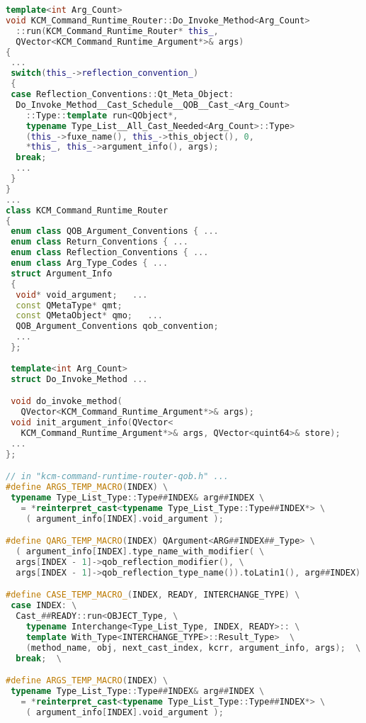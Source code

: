 \vspace{-.5em}
\begin{lstlisting}[caption={%
\emblink{\#lst--rzsem--\thelstlisting.pgvm-pdf}{Sample Code Graph Evaluator}},
  language = C++, numbers = none, label={lst:rzsem},
    basicstyle = \ttfamily\bfseries\footnotesize, linewidth = \linewidth]
template<int Arg_Count> 
void KCM_Command_Runtime_Router::Do_Invoke_Method<Arg_Count>
  ::run(KCM_Command_Runtime_Router* this_, 
  QVector<KCM_Command_Runtime_Argument*>& args)
{
 ...
 switch(this_->reflection_convention_)
 {
 case Reflection_Conventions::Qt_Meta_Object:
  Do_Invoke_Method__Cast_Schedule__QOB__Cast_<Arg_Count>
    ::Type::template run<QObject*, 
    typename Type_List__All_Cast_Needed<Arg_Count>::Type>
    (this_->fuxe_name(), this_->this_object(), 0, 
    *this_, this_->argument_info(), args);
  break;
  ...
 }
}
...
class KCM_Command_Runtime_Router
{
 enum class QOB_Argument_Conventions { ...
 enum class Return_Conventions { ...
 enum class Reflection_Conventions { ...
 enum class Arg_Type_Codes { ...
 struct Argument_Info 
 {
  void* void_argument;   ...
  const QMetaType* qmt;
  const QMetaObject* qmo;   ...
  QOB_Argument_Conventions qob_convention; 
  ...
 };
 
 template<int Arg_Count>
 struct Do_Invoke_Method ...

 void do_invoke_method(
   QVector<KCM_Command_Runtime_Argument*>& args);
 void init_argument_info(QVector<
   KCM_Command_Runtime_Argument*>& args, QVector<quint64>& store);
 ...
};

// in "kcm-command-runtime-router-qob.h" ...
#define ARGS_TEMP_MACRO(INDEX) \
 typename Type_List_Type::Type##INDEX& arg##INDEX \
   = *reinterpret_cast<typename Type_List_Type::Type##INDEX*> \
    ( argument_info[INDEX].void_argument );

#define QARG_TEMP_MACRO(INDEX) QArgument<ARG##INDEX##_Type> \
  ( argument_info[INDEX].type_name_with_modifier( \
  args[INDEX - 1]->qob_reflection_modifier(), \
  args[INDEX - 1]->qob_reflection_type_name()).toLatin1(), arg##INDEX) \

#define CASE_TEMP_MACRO_(INDEX, READY, INTERCHANGE_TYPE) \
 case INDEX: \
  Cast_##READY::run<OBJECT_Type, \
    typename Interchange<Type_List_Type, INDEX, READY>:: \
    template With_Type<INTERCHANGE_TYPE>::Result_Type>  \
    (method_name, obj, next_cast_index, kcrr, argument_info, args);  \
  break;  \

#define ARGS_TEMP_MACRO(INDEX) \
 typename Type_List_Type::Type##INDEX& arg##INDEX \
   = *reinterpret_cast<typename Type_List_Type::Type##INDEX*> \
    ( argument_info[INDEX].void_argument );


\end{lstlisting}
